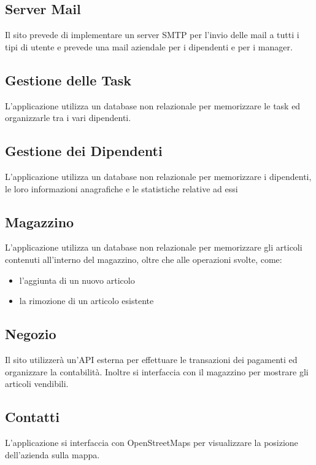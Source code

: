 \documentclass{report}
\begin{document}
\subsection*{Server Mail}
Il sito prevede di implementare un server SMTP per l’invio delle mail a tutti i tipi di utente e prevede una mail aziendale per i dipendenti e per i manager.

\subsection*{Gestione delle Task}
L’applicazione utilizza un database non relazionale per memorizzare le task ed organizzarle tra i vari dipendenti.

\subsection*{Gestione dei Dipendenti}
L’applicazione utilizza un database non relazionale per memorizzare i dipendenti, le loro informazioni anagrafiche e le statistiche relative ad essi

\subsection*{Magazzino}
L’applicazione utilizza un database non relazionale per memorizzare gli articoli contenuti all’interno del magazzino, oltre che alle operazioni svolte, come:

\begin{itemize}
	\item l’aggiunta di un nuovo articolo
	
	\item la rimozione di un articolo esistente
\end{itemize}

\subsection*{Negozio}
Il sito utilizzerà un’API esterna per effettuare le transazioni dei pagamenti ed organizzare la contabilità. Inoltre si interfaccia con il magazzino per mostrare gli articoli vendibili.


\subsection*{Contatti}
L'applicazione si interfaccia con OpenStreetMaps per visualizzare la posizione dell’azienda sulla mappa.
\end{document}
